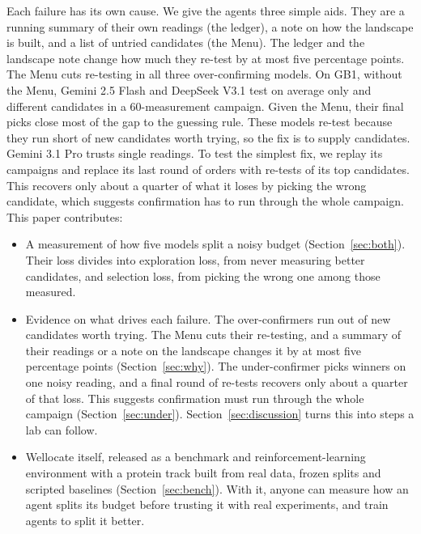 Each failure has its own cause. We give the agents three simple aids. They are a running summary of their own readings
(the ledger), a note on how the landscape is built, and a list of untried candidates (the Menu). The ledger and the landscape note change how much they re-test by at most five percentage points. The Menu cuts re-testing in all three over-confirming models. On GB1,
without the Menu, Gemini 2.5 Flash and DeepSeek V3.1 test on average only \nGbDistinctFlash{} and
\nGbDistinctDeep{} different candidates in a 60-measurement campaign. Given the Menu, their final picks close most of
the gap to the guessing rule. These models re-test because they run short of new candidates worth trying, so the fix
is to supply candidates. Gemini 3.1 Pro trusts single readings. To test the simplest fix,
we replay its campaigns and replace its last round of orders with re-tests of its top candidates. This recovers only
about a quarter of what it loses by picking the wrong candidate, which suggests confirmation has to run through the
whole campaign. This paper contributes:
\begin{itemize}
\item A measurement of how five models split a noisy budget (Section~\ref{sec:both}). Their loss divides into
exploration loss, from never measuring better candidates, and selection loss, from picking the wrong one among those measured.
\item Evidence on what drives each failure. The over-confirmers run out of new candidates worth trying. The Menu cuts their re-testing, and a summary of their readings or a note on the landscape changes it by at most five percentage points
(Section~\ref{sec:why}). The under-confirmer picks winners on one noisy reading, and a final round of re-tests
recovers only about a quarter of that loss. This suggests confirmation must run through the whole campaign
(Section~\ref{sec:under}). Section~\ref{sec:discussion} turns this into steps a lab can follow.
\item Wellocate itself, released as a benchmark and reinforcement-learning environment with a protein track built from real data,
frozen splits and scripted baselines (Section~\ref{sec:bench}). With it, anyone can measure how an agent splits its budget before trusting it with real experiments, and train agents to split it better.
\end{itemize}

